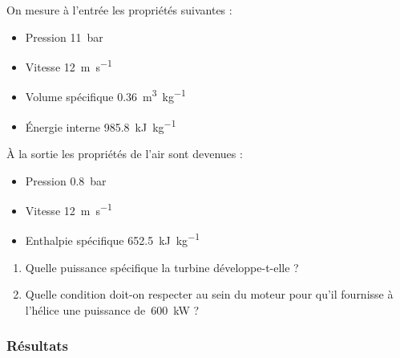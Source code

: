 	On mesure à l’entrée les propriétés suivantes :
	\begin{itemize}
		\item Pression 		\tab \SI{11}{\bar}
		\item Vitesse 		\tab \SI{12}{\metre\per\second}
		\item Volume spécifique 		\tab \SI{0,36}{\metre\cubed\per\kilogram}
		\item Énergie interne 		\tab \SI{985,8}{\kilo\joule\per\kilogram}
	\end{itemize}
	
	À la sortie les propriétés de l’air sont devenues :	
	\begin{itemize}
		\item Pression 		\tab \SI{0,8}{\bar}
		\item Vitesse 		\tab \SI{12}{\metre\per\second}
		\item Enthalpie spécifique 		\tab \SI{652,5}{\kilo\joule\per\kilogram}
	\end{itemize}

	\begin{enumerate}
		\item Quelle puissance spécifique la turbine développe-t-elle ?
		\item Quelle condition doit-on respecter au sein du moteur pour qu’il fournisse à l’hélice une puissance de~\SI{600}{\kilo\watt} ?
	\end{enumerate}

\exercisesolutionpage
\subsubsection*{Résultats}
	\linktosolutionsblurb


